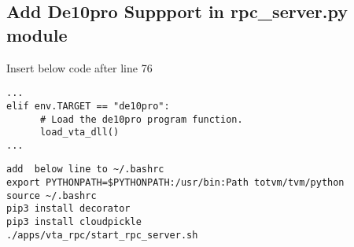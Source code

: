 \documentclass{article}
\begin{document}
\subsection{Add De10pro Suppport in rpc\_server.py module }
Insert below code after line 76
\begin{lstlisting}
...
elif env.TARGET == "de10pro":
      # Load the de10pro program function.
      load_vta_dll()
...
\end{lstlisting}
\begin{lstlisting}
add  below line to ~/.bashrc
export PYTHONPATH=$PYTHONPATH:/usr/bin:Path totvm/tvm/python
source ~/.bashrc
pip3 install decorator
pip3 install cloudpickle
./apps/vta_rpc/start_rpc_server.sh
\end{lstlisting}
\end{document}
